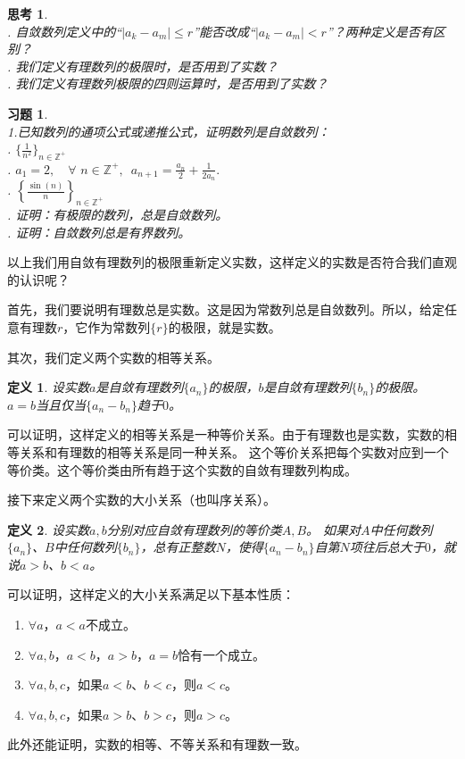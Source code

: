 \documentclass[12pt,UTF8]{ctexbook}
\newtheorem{df}{定义}[section]
\newtheorem{sk}{思考}[section]
\newtheorem{xt}{习题}[section]
\begin{document}
\begin{sk}
    \mbox{}\\
    . 自敛数列定义中的“$|a_k -a_m| \leqslant r$”能否改成“$|a_k -a_m| < r$”？两种定义是否有区别？\\
    . 我们定义有理数列的极限时，是否用到了实数？\\
    . 我们定义有理数列极限的四则运算时，是否用到了实数？
\end{sk}
\begin{xt}
    \mbox{}\\
    \indent 1.已知数列的通项公式或递推公式，证明数列是自敛数列：\\
    . $\{\frac{1}{n^2}\}_{n\in\mathbb{Z}^+}$\\
    . $a_1 = 2, \quad \forall \,\, n\in\mathbb{Z}^+, \,\,\, a_{n+1} = \frac{a_n}{2} + \frac{1}{2a_n}.$\\
    . $\left\{\frac{\sin(n)}{n}\right\}_{n\in\mathbb{Z}^+}$ \\
    . 证明：有极限的数列，总是自敛数列。\\
    . 证明：自敛数列总是有界数列。
\end{xt}

以上我们用自敛有理数列的极限重新定义实数，这样定义的实数是否符合我们直观的认识呢？

首先，我们要说明有理数总是实数。这是因为常数列总是自敛数列。所以，给定任意有理数$r$，它作为常数列$\{r\}$的极限，就是实数。

其次，我们定义两个实数的相等关系。
\begin{df}
    设实数$a$是自敛有理数列$\{a_n\}$的极限，$b$是自敛有理数列$\{b_n\}$的极限。
    $a = b$当且仅当$\{a_n - b_n\}$趋于$0$。
\end{df}
可以证明，这样定义的相等关系是一种等价关系。由于有理数也是实数，实数的相等关系和有理数的相等关系是同一种关系。
这个等价关系把每个实数对应到一个等价类。这个等价类由所有趋于这个实数的自敛有理数列构成。

接下来定义两个实数的大小关系（也叫序关系）。
\begin{df}
    设实数$a,b$分别对应自敛有理数列的等价类$A,B$。
    如果对$A$中任何数列$\{a_n\}$、$B$中任何数列$\{b_n\}$，总有正整数$N$，使得$\{a_n - b_n\}$自第$N$项往后总大于$0$，就说$a>b$、$b<a$。
\end{df}
可以证明，这样定义的大小关系满足以下基本性质：
\begin{enumerate}
    \item $\forall a$，$a < a$不成立。
    \item $\forall a, b$，$a < b$，$a > b$，$a = b$恰有一个成立。
    \item $\forall a, b, c$，如果$a < b$、$b < c$，则$a < c$。
    \item $\forall a, b, c$，如果$a > b$、$b > c$，则$a > c$。
\end{enumerate}
此外还能证明，实数的相等、不等关系和有理数一致。
\end{document}
